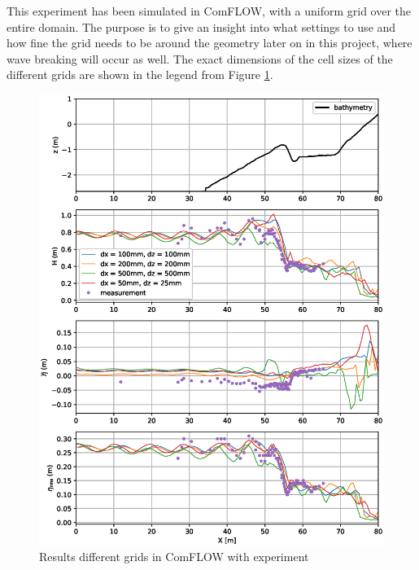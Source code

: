 This experiment has been simulated in ComFLOW, with a uniform grid over the entire domain. The purpose is to give an insight into what settings to use and how fine the grid needs to be around the geometry later on in this project, where wave breaking will occur as well. The exact dimensions of the cell sizes of the different grids are shown in the legend from Figure \ref{fig:breakerbarexperiment}. 




\begin{figure}[H]
    \centering
    \includegraphics[width=0.8\linewidth]{figures/Validation/plot_stats_compare_H-1.eps}
    \caption{Results different grids in ComFLOW with experiment \parencite{breakerbarexperiment}}
    \label{fig:breakerbarexperiment}
\end{figure}


